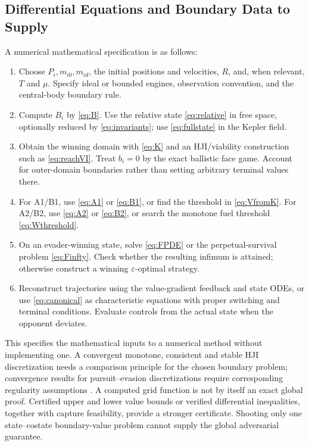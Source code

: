\documentclass[journal,a4paper]{IEEEtran}
\begin{document}
\subsection{Differential Equations and Boundary Data to Supply}
A numerical mathematical specification is as follows:
\begin{enumerate}
\item Choose $P_i,m_{i0},m_{id}$, the initial positions and velocities, $R$, and, when relevant, $T$ and $\mu$. Specify ideal or bounded engines, observation convention, and the central-body boundary rule.
\item Compute $B_i$ by \eqref{eq:B}. Use the relative state \eqref{eq:relative} in free space, optionally reduced by \eqref{eq:invariants}; use \eqref{eq:fullstate} in the Kepler field.
\item Obtain the winning domain with \eqref{eq:K} and an HJI/viability construction such as \eqref{eq:reachVI}. Treat $b_i=0$ by the exact ballistic face game. Account for outer-domain boundaries rather than setting arbitrary terminal values there.
\item For A1/B1, use \eqref{eq:A1} or \eqref{eq:B1}, or find the threshold in \eqref{eq:VfromK}. For A2/B2, use \eqref{eq:A2} or \eqref{eq:B2}, or search the monotone fuel threshold \eqref{eq:Wthreshold}.
\item On an evader-winning state, solve \eqref{eq:FPDE} or the perpetual-survival problem \eqref{eq:Finfty}. Check whether the resulting infimum is attained; otherwise construct a winning $\varepsilon$-optimal strategy.
\item Reconstruct trajectories using the value-gradient feedback and state ODEs, or use \eqref{eq:canonical} as characteristic equations with proper switching and terminal conditions. Evaluate controls from the actual state when the opponent deviates.
\end{enumerate}
This specifies the mathematical inputs to a numerical method without implementing one. A convergent monotone, consistent and stable HJI discretization needs a comparison principle for the chosen boundary problem; convergence results for pursuit--evasion discretizations require corresponding regularity assumptions \cite{Soravia1998}. A computed grid function is not by itself an exact global proof. Certified upper and lower value bounds or verified differential inequalities, together with capture feasibility, provide a stronger certificate. Shooting only one state--costate boundary-value problem cannot supply the global adversarial guarantee.
\end{document}

